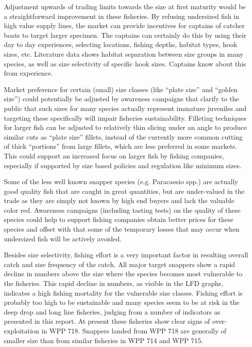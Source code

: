 Adjustment upwards of trading limits towards the size at first maturity would be a straightforward improvement in these fisheries. By refusing undersized fish in high value supply lines, the market can provide incentives for captains of catcher boats to target larger specimen. The captains can certainly do this by using their day to day experiences, selecting locations, fishing depths, habitat types, hook sizes, etc. Literature data shows habitat separation between size groups in many species, as well as size selectivity of specific hook sizes. Captains know about this from experience.

Market preference for certain (small) size classes (like ``plate size'' and ``golden size'') could potentially be adjusted by awareness campaigns that clarify to the public that such sizes for many species actually represent immature juveniles and targeting these specifically will impair fisheries sustainability. Filleting techniques for larger fish can be adjusted to relatively thin slicing under an angle to produce similar cuts as ``plate size'' fillets, instead of the currently more common cutting of thick ``portions'' from large fillets, which are less preferred in some markets. This could support an increased focus on larger fish by fishing companies, especially if supported by size based policies and regulation like minimum sizes.

Some of the less well known snapper species (e.g. Paracaesio spp.) are actually good quality fish that are caught in great quantities, but are under-valued in the trade as they are simply not known by high end buyers and lack the valuable color red. Awareness campaigns (including tasting tests) on the quality of these species could help to support fishing companies obtain better prices for these species and offset with that some of the temporary losses that may occur when undersized fish will be actively avoided.

Besides size selectivity, fishing effort is a very important factor in resulting overall catch and size frequency of the catch. All major target snappers show a rapid decline in numbers above the size where the species becomes most vulnerable to the fisheries. This rapid decline in numbers, as visible in the LFD graphs, indicates a high fishing mortality for the vulnerable size classes. Fishing effort is probably too high to be sustainable and many species seem to be at risk in the deep drop and long line fisheries, judging from a number of indicators as presented in this report. At present these fisheries show clear signs of over-exploitation in WPP 718. Snappers landed from WPP 718 are generally of smaller size than from similar fisheries in WPP 714 and WPP 715.

